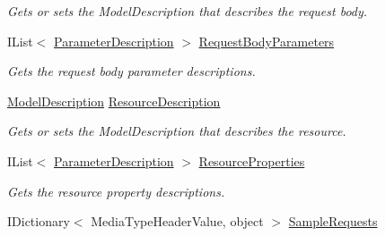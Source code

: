 \begin{DoxyCompactItemize}
\begin{DoxyCompactList}\small\item\em Gets or sets the Model\+Description that describes the request body. \end{DoxyCompactList}\item 
I\+List$<$ \hyperlink{class_open_1_1_g_i_1_1hypermart_1_1_areas_1_1_help_page_1_1_model_descriptions_1_1_parameter_description}{Parameter\+Description} $>$ \hyperlink{class_open_1_1_g_i_1_1hypermart_1_1_areas_1_1_help_page_1_1_models_1_1_help_page_api_model_a6b2ccd725318cec7557237bb25272ac0}{Request\+Body\+Parameters}
\begin{DoxyCompactList}\small\item\em Gets the request body parameter descriptions. \end{DoxyCompactList}\item 
\hyperlink{class_open_1_1_g_i_1_1hypermart_1_1_areas_1_1_help_page_1_1_model_descriptions_1_1_model_description}{Model\+Description} \hyperlink{class_open_1_1_g_i_1_1hypermart_1_1_areas_1_1_help_page_1_1_models_1_1_help_page_api_model_a69f18559e320aecc4dc81f68b8327729}{Resource\+Description}
\begin{DoxyCompactList}\small\item\em Gets or sets the Model\+Description that describes the resource. \end{DoxyCompactList}\item 
I\+List$<$ \hyperlink{class_open_1_1_g_i_1_1hypermart_1_1_areas_1_1_help_page_1_1_model_descriptions_1_1_parameter_description}{Parameter\+Description} $>$ \hyperlink{class_open_1_1_g_i_1_1hypermart_1_1_areas_1_1_help_page_1_1_models_1_1_help_page_api_model_a1fc678443900b538ee0b4bbd22e9b4d3}{Resource\+Properties}
\begin{DoxyCompactList}\small\item\em Gets the resource property descriptions. \end{DoxyCompactList}\item 
I\+Dictionary$<$ Media\+Type\+Header\+Value, object $>$ \hyperlink{class_open_1_1_g_i_1_1hypermart_1_1_areas_1_1_help_page_1_1_models_1_1_help_page_api_model_a5ba6db9c9586dc77949e8d824cca46b3}{Sample\+Requests}

\end{DoxyCompactItemize}
